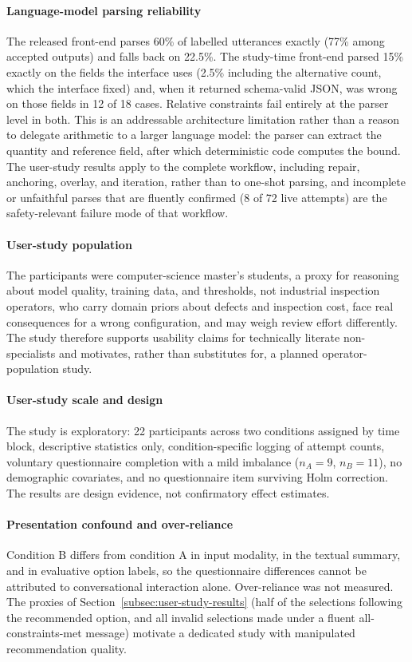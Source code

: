 \documentclass[final,5p,times,twocolumn]{elsarticle}
\begin{document}
\paragraph{Language-model parsing reliability}
The released front-end parses 60\% of labelled utterances exactly
(77\% among accepted outputs) and falls back on 22.5\%. The study-time front-end parsed 15\% exactly on the fields the interface uses (2.5\% including the alternative count, which the interface fixed) and, when it returned schema-valid JSON, was wrong on those fields in 12 of 18 cases. Relative constraints fail entirely
at the parser level in both. This is an addressable architecture
limitation rather than a reason to delegate arithmetic to a larger
language model: the parser can extract the quantity and reference
field, after which deterministic code computes the bound. The
user-study results apply to the complete workflow, including repair,
anchoring, overlay, and iteration, rather than to one-shot parsing, and incomplete or unfaithful parses that are fluently confirmed (8 of 72 live attempts) are the safety-relevant failure mode of that workflow.

\paragraph{User-study population}
The participants were computer-science master's students, a proxy for
reasoning about model quality, training data, and thresholds, not
industrial inspection operators, who carry domain priors about defects
and inspection cost, face real consequences for a wrong configuration,
and may weigh review effort differently. The study therefore supports
usability claims for technically literate non-specialists and
motivates, rather than substitutes for, a planned operator-population
study.

\paragraph{User-study scale and design}
The study is exploratory: 22 participants across two conditions
assigned by time block, descriptive statistics only, condition-specific
logging of attempt counts, voluntary questionnaire completion with a
mild imbalance ($n_A = 9$, $n_B = 11$), no demographic covariates, and
no questionnaire item surviving Holm correction. The results are design
evidence, not confirmatory effect estimates.

\paragraph{Presentation confound and over-reliance}
Condition B differs from condition A in input modality, in the textual
summary, and in evaluative option labels, so the questionnaire
differences cannot be attributed to conversational interaction alone.
Over-reliance was not measured. The proxies of Section~\ref{subsec:user-study-results} (half of the selections following the recommended option, and all invalid selections made under a
fluent all-constraints-met message) motivate a dedicated study with
manipulated recommendation quality.
\end{document}
